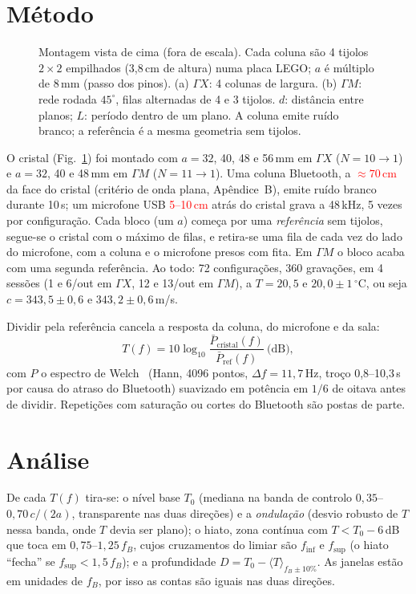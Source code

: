 \documentclass[10pt,twocolumn,a4paper]{article}
\newcommand{\confirmar}[1]{\textcolor{red}{#1}}   %
\newcommand{\GX}{\Gamma X}
\newcommand{\GM}{\Gamma M}
\newcommand{\finf}{f_\text{inf}}
\newcommand{\fsup}{f_\text{sup}}
\begin{document}
\section{Método}
\begin{figure}[t]
  \centering
  
  \caption{Montagem vista de cima (fora de escala). Cada coluna são 4 tijolos $2{\times}2$
  empilhados (3,8\,cm de altura) numa placa LEGO; $a$ é múltiplo de 8\,mm (passo dos pinos).
  (a) $\GX$: 4 colunas de largura. (b) $\GM$: rede rodada $45^\circ$, filas alternadas de 4 e 3
  tijolos. $d$: distância entre planos; $L$: período dentro de um plano. A coluna emite ruído
  branco; a referência é a mesma geometria sem tijolos.}
  \label{fig:montagem}
\end{figure}
O cristal (Fig.~\ref{fig:montagem}) foi montado com $a=32$, 40, 48 e 56\,mm em $\GX$
($N=10\to1$) e $a=32$, 40 e 48\,mm em $\GM$ ($N=11\to1$). Uma coluna Bluetooth, a
\confirmar{${\approx}70$\,cm} da face do cristal (critério de onda plana, Apêndice~B), emite ruído branco
durante 10\,s; um microfone USB \confirmar{5--10\,cm} atrás do cristal grava a 48\,kHz, 5 vezes por
configuração. Cada bloco (um $a$) começa por uma \emph{referência} sem tijolos, segue-se o cristal
com o máximo de filas, e retira-se uma fila de cada vez do lado do microfone, com a coluna e o
microfone presos com fita. Em $\GM$ o bloco acaba com uma segunda referência. Ao todo: 72
configurações, 360 gravações, em 4 sessões (1 e 6/out em $\GX$, 12 e 13/out em $\GM$), a
$T=20{,}5$ e $20{,}0\pm1\,^\circ$C, ou seja $c=343{,}5\pm0{,}6$ e $343{,}2\pm0{,}6$\,m/s.

Dividir pela referência cancela a resposta da coluna, do microfone e da sala:
\begin{equation}
  T(f)=10\log_{10}\frac{\bar P_\text{cristal}(f)}{\bar P_\text{ref}(f)}\ \text{(dB)},
\end{equation}
com $P$ o espectro de Welch~\cite{welch1967} (Hann, 4096 pontos, $\Delta f=11{,}7$\,Hz, troço 0,8--10,3\,s por causa
do atraso do Bluetooth) suavizado em potência em $1/6$ de oitava antes de dividir. Repetições com
saturação ou cortes do Bluetooth são postas de parte.

\section{Análise}
De cada $T(f)$ tira-se: o nível base $T_0$ (mediana na banda de controlo $0{,}35$--$0{,}70\,c/(2a)$,
transparente nas duas direções) e a \emph{ondulação} (desvio robusto de $T$ nessa banda, onde $T$
devia ser plano); o hiato, zona contínua com $T<T_0-6$\,dB que toca em $0{,}75$--$1{,}25\,f_B$, cujos
cruzamentos do limiar são $\finf$ e $\fsup$ (o hiato ``fecha'' se $\fsup<1{,}5\,f_B$); e a profundidade
$D=T_0-\langle T\rangle_{f_B\pm10\%}$. As janelas estão em unidades de $f_B$, por isso as contas são
iguais nas duas direções.
\end{document}
